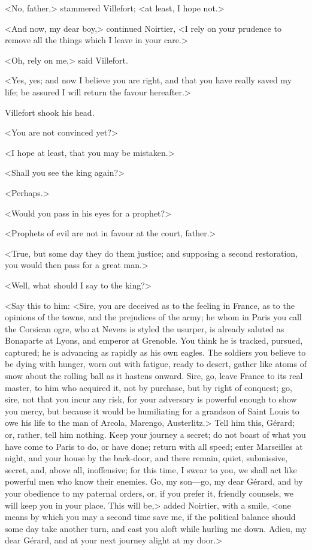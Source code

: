  <No, father,> stammered Villefort; <at least, I hope not.> 

 <And now, my dear boy,> continued Noirtier, <I rely on your prudence to remove all the things which I leave in your care.> 

 <Oh, rely on me,> said Villefort. 

 <Yes, yes; and now I believe you are right, and that you have really saved my life; be assured I will return the favour hereafter.> 

 Villefort shook his head. 

 <You are not convinced yet?> 

 <I hope at least, that you may be mistaken.> 

 <Shall you see the king again?> 

 <Perhaps.> 

 <Would you pass in his eyes for a prophet?> 

 <Prophets of evil are not in favour at the court, father.> 

 <True, but some day they do them justice; and supposing a second restoration, you would then pass for a great man.> 

 <Well, what should I say to the king?> 

 <Say this to him: <Sire, you are deceived as to the feeling in France, as to the opinions of the towns, and the prejudices of the army; he whom in Paris you call the Corsican ogre, who at Nevers is styled the usurper, is already saluted as Bonaparte at Lyons, and emperor at Grenoble. You think he is tracked, pursued, captured; he is advancing as rapidly as his own eagles. The soldiers you believe to be dying with hunger, worn out with fatigue, ready to desert, gather like atoms of snow about the rolling ball as it hastens onward. Sire, go, leave France to its real master, to him who acquired it, not by purchase, but by right of conquest; go, sire, not that you incur any risk, for your adversary is powerful enough to show you mercy, but because it would be humiliating for a grandson of Saint Louis to owe his life to the man of Arcola, Marengo, Austerlitz.> Tell him this, Gérard; or, rather, tell him nothing. Keep your journey a secret; do not boast of what you have come to Paris to do, or have done; return with all speed; enter Marseilles at night, and your house by the back-door, and there remain, quiet, submissive, secret, and, above all, inoffensive; for this time, I swear to you, we shall act like powerful men who know their enemies. Go, my son—go, my dear Gérard, and by your obedience to my paternal orders, or, if you prefer it, friendly counsels, we will keep you in your place. This will be,> added Noirtier, with a smile, <one means by which you may a second time save me, if the political balance should some day take another turn, and cast you aloft while hurling me down. Adieu, my dear Gérard, and at your next journey alight at my door.> 

